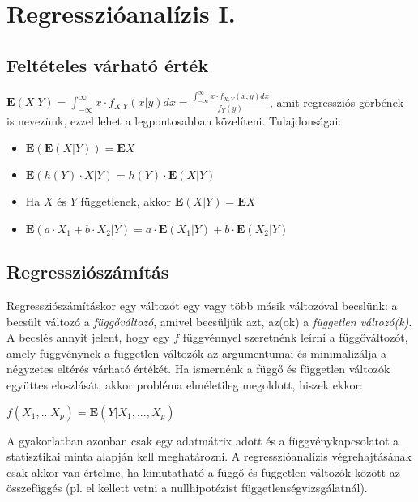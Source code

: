 \chapter{Regresszióanalízis I.} \label{sec:reg1}

\section{Feltételes várható érték}

$\mathbf{E}(X|Y) = \int_{-\infty}^\infty x \cdot f_{X|Y}(x|y)dx=\frac{\int_{-\infty}^\infty x \cdot f_{X,Y}(x,y)dx}{f_Y(y)}$, amit regressziós görbének is nevezünk, ezzel lehet a legpontosabban közelíteni. Tulajdonságai:
\begin{itemize}
\item $\mathbf{E}(\mathbf{E}(X|Y)) = \mathbf{E}X$
\item $\mathbf{E}(h(Y) \cdot X | Y) = h(Y) \cdot \mathbf{E}(X|Y)$
\item Ha $X$ és $Y$ függetlenek, akkor $\mathbf{E}(X|Y) = \mathbf{E}X$
\item $\mathbf{E}(a \cdot X_1 + b \cdot X_2 |Y) = a \cdot \mathbf{E}(X_1|Y) + b \cdot \mathbf{E}(X_2|Y)$
\end{itemize}


\section{Regressziószámítás}

Regressziószámításkor egy változót egy vagy több másik változóval becslünk: a becsült változó a \emph{függőváltozó}, amivel becsüljük azt, az(ok) a \emph{független változó(k)}. A becslés annyit jelent, hogy egy $f$ függvénnyel szeretnénk leírni a függőváltozót, amely függvénynek a független változók az argumentumai és minimalizálja a négyzetes eltérés várható értékét. Ha ismernénk a függő és független változók együttes eloszlását, akkor probléma elméletileg megoldott, hiszek ekkor:

$f(X_1,...X_p) = \mathbf{E}(Y| X_1, ..., X_p)$

A gyakorlatban azonban csak egy adatmátrix adott és a függvénykapcsolatot a statisztikai minta alapján kell meghatározni. A regresszióanalízis végrehajtásának csak akkor van értelme, ha kimutatható a függő és független változók között az összefüggés (pl. el kellett vetni a nullhipotézist függetlenségvizsgálatnál).

